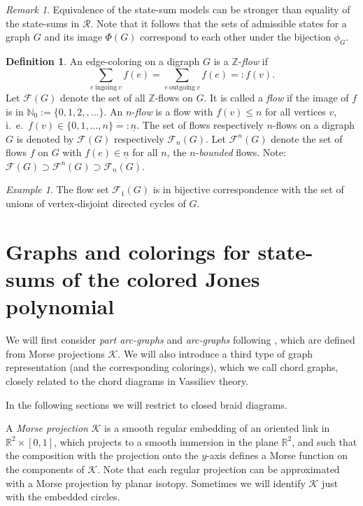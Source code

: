 \documentclass[11pt]{article}
\theoremstyle{definition}
\newtheorem{defn}{Definition}[section]
\theoremstyle{remark}
\newtheorem*{rem}{Remark}
\theoremstyle{remark}
\newtheorem*{exmp}{Example}
\begin{document}
\begin{rem} Equivalence of the state-sum models can be stronger than equality of the state-sums in $\mathcal{R}$. Note that it follows that the sets of admissible states for a graph $G$ and its image $\Phi (G)$ correspond to each other under the bijection $\phi _G$. \end{rem}

\begin{defn} \label{defn:edge coloring} An edge-coloring on a digraph $G$ is a $\mathbb{Z}$-\textit{flow} if 
$$\sum_{e\ \textrm{ingoing}\ v}f(e)=\sum_{e\ \textrm{outgoing}\ v}f(e)=:f(v).$$
Let $\mathcal{F}(G)$ denote the set of all $\mathbb{Z}$-flows on $G$.
It is called a \textit{flow} if the image of $f$ is in $\mathbb{N}_0:=\{0,1,2,,\ldots \}$.
An $n$-\textit{flow} is a flow with $f(v)\leq n$ for all vertices $v$, i.\ e.\ $f(v)\in \{0,1,\ldots ,n\}=:\underline{n}$.
The set of flows respectively $n$-flows on a digraph $G$ is denoted by $\mathcal{F}(G)$ respectively $\mathcal{F}_n(G)$.
Let $\mathcal{F}^n(G)$ denote the set of flows $f$ on $G$ with $f(e)\in \underline{n}$ for all $n$, the $n$-\textit{bounded} flows. Note: $\mathcal{F}(G)\supset \mathcal{F}^n(G)\supset \mathcal{F}_n(G)$. \end{defn}

\begin{exmp} The flow set $\mathcal{F}_1(G)$ is in bijective correspondence with the set of unions of vertex-disjoint directed cycles of $G$. \end{exmp}

\vskip 0.2in


\section{Graphs and colorings for state-sums of the colored Jones polynomial}

\vskip 0.1in

We will first consider \textit{part arc-graphs} and \textit{arc-graphs} following \cite{GL}, which are defined from Morse projections $\mathcal{K}$. We will also introduce a third type of graph representation (and the corresponding colorings), which we call chord graphs, closely related to the chord diagrams in Vassiliev theory. 

In the following sections we will restrict to closed braid diagrams.

A \textit{Morse projection} $\mathcal{K}$ is a smooth regular embedding of an oriented link in $\mathbb{R}^2\times [0,1]$, which projects to a smooth immersion in the plane $\mathbb{R}^2$, and such that the composition with the projection onto the $y$-axis defines a Morse function on the components of $\mathcal{K}$. Note that each regular projection can be approximated with a Morse projection by planar isotopy. Sometimes we will identify $\mathcal{K}$ just with the embedded circles. 
\end{document}
